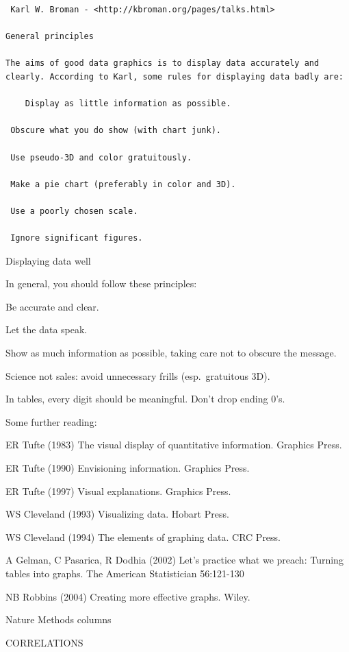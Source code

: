 \documentclass[
]{book}
\begin{document}
\begin{verbatim}
 Karl W. Broman - <http://kbroman.org/pages/talks.html>

General principles

The aims of good data graphics is to display data accurately and clearly. According to Karl, some rules for displaying data badly are:

    Display as little information as possible.

 Obscure what you do show (with chart junk).

 Use pseudo-3D and color gratuitously.

 Make a pie chart (preferably in color and 3D).

 Use a poorly chosen scale.

 Ignore significant figures.
\end{verbatim}

Displaying data well

In general, you should follow these principles:

Be accurate and clear.

Let the data speak.

Show as much information as possible, taking care not to obscure the message.

Science not sales: avoid unnecessary frills (esp.~gratuitous 3D).

In tables, every digit should be meaningful. Don't drop ending 0's.

Some further reading:

ER Tufte (1983) The visual display of quantitative information. Graphics Press.

ER Tufte (1990) Envisioning information. Graphics Press.

ER Tufte (1997) Visual explanations. Graphics Press.

WS Cleveland (1993) Visualizing data. Hobart Press.

WS Cleveland (1994) The elements of graphing data. CRC Press.

A Gelman, C Pasarica, R Dodhia (2002) Let's practice what we preach: Turning tables into graphs. The American Statistician 56:121-130

NB Robbins (2004) Creating more effective graphs. Wiley.

Nature Methods columns

CORRELATIONS
\end{document}
